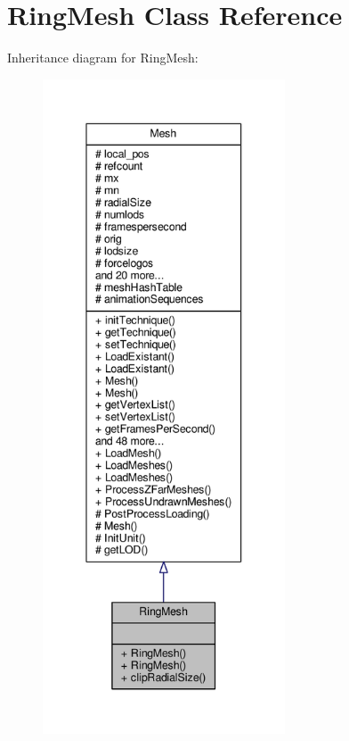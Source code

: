 \hypertarget{classRingMesh}{}\section{Ring\+Mesh Class Reference}
\label{classRingMesh}


Inheritance diagram for Ring\+Mesh\+:
\nopagebreak
\begin{figure}[H]
\begin{center}
\leavevmode
\includegraphics[height=550pt]{da/d88/classRingMesh__inherit__graph}
\end{center}
\end{figure}


